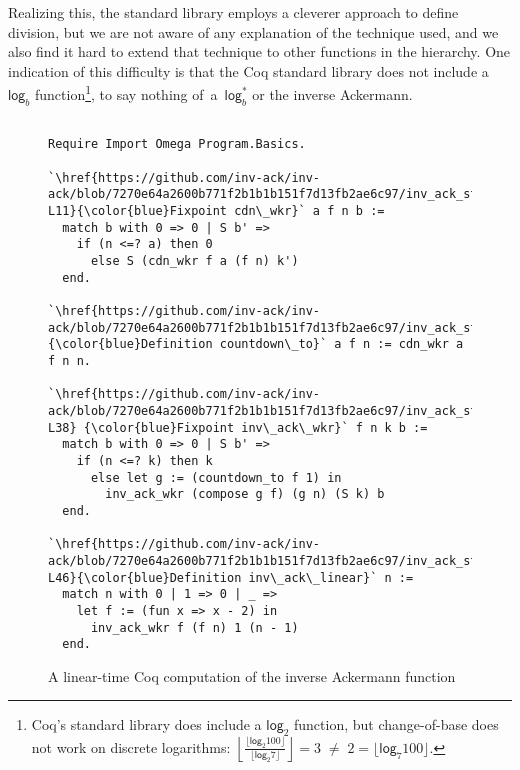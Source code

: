 Realizing this, the standard library employs
a cleverer approach to define division, but we are not aware of any explanation
of the technique used, and we also find it hard to extend that technique
to other functions in the hierarchy.  One indication
of this difficulty is that the Coq standard library does not include a $\mathsf{log}_b$ function\footnote{Coq's standard library does include a $\mathsf{log}_2$ function, but
change-of-base does not work on discrete logarithms:
$\left \lfloor \frac{\lfloor \mathsf{log}_2 100 \rfloor}{\lfloor \mathsf{log}_2 7 \rfloor} \right \rfloor = 3 \; \not= \; 2 = \lfloor \mathsf{log}_7 100 \rfloor$.
}, to say nothing of~a~$\mathsf{log}^{*}_b$ or the inverse Ackermann.

\begin{figure}
\lstset{style=myTinyStyle}
\begin{lstlisting}

Require Import Omega Program.Basics.

`\href{https://github.com/inv-ack/inv-ack/blob/7270e64a2600b771f2b1b1b151f7d13fb2ae6c97/inv_ack_standalone.v#L6-L11}{\color{blue}Fixpoint cdn\_wkr}` a f n b :=
  match b with 0 => 0 | S b' =>
    if (n <=? a) then 0
      else S (cdn_wkr f a (f n) k')
  end.

`\href{https://github.com/inv-ack/inv-ack/blob/7270e64a2600b771f2b1b1b151f7d13fb2ae6c97/inv_ack_standalone.v#L14}{\color{blue}Definition countdown\_to}` a f n := cdn_wkr a f n n.

`\href{https://github.com/inv-ack/inv-ack/blob/7270e64a2600b771f2b1b1b151f7d13fb2ae6c97/inv_ack_standalone.v#L32-L38} {\color{blue}Fixpoint inv\_ack\_wkr}` f n k b :=
  match b with 0 => 0 | S b' =>
    if (n <=? k) then k
      else let g := (countdown_to f 1) in
        inv_ack_wkr (compose g f) (g n) (S k) b
  end.

`\href{https://github.com/inv-ack/inv-ack/blob/7270e64a2600b771f2b1b1b151f7d13fb2ae6c97/inv_ack_standalone.v#L42-L46}{\color{blue}Definition inv\_ack\_linear}` n :=
  match n with 0 | 1 => 0 | _ => 
    let f := (fun x => x - 2) in
      inv_ack_wkr f (f n) 1 (n - 1)
  end.
\end{lstlisting}
\caption{A linear-time Coq computation of the inverse Ackermann function}
\label{fig:standalone}
\end{figure}


